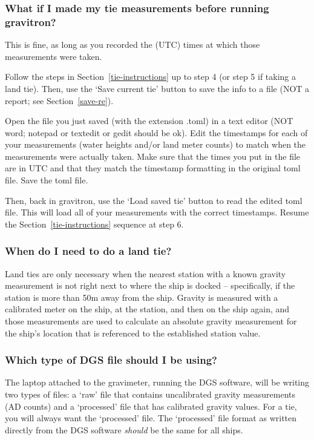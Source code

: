 \documentclass{pfpe-manual}
\begin{document}
\subsubsection{What if I made my tie measurements before running gravitron?}
\label{later}
This is fine, as long as you recorded the (UTC) times at which those measurements were taken.

Follow the steps in Section~\ref{tie-instructions} up to step 4 (or step 5 if taking a land tie). Then, use the `Save current tie' button to save the info to a file (NOT a report; see Section~\ref{save-re}). 

Open the file you just saved (with the extension .toml) in a text editor (NOT word; notepad or textedit or gedit should be ok). Edit the timestamps for each of your measurements (water heights and/or land meter counts) to match when the measurements were actually taken. Make sure that the times you put in the file are in UTC and that they match the timestamp formatting in the original toml file. Save the toml file. 

Then, back in gravitron, use the `Load saved tie' button to read the edited toml file. This will load all of your measurements with the correct timestamps. Resume the Section~\ref{tie-instructions} sequence at step 6.

\subsubsection{When do I need to do a land tie?}
Land ties are only necessary when the nearest station with a known gravity measurement is not right next to where the ship is docked -- specifically, if the station is more than 50m away from the ship. Gravity is measured with a calibrated meter on the ship, at the station, and then on the ship again, and those measurements are used to calculate an absolute gravity measurement for the ship's location that is referenced to the established station value.

\subsubsection{Which type of DGS file should I be using?}
\label{file-types}
The laptop attached to the gravimeter, running the DGS software, will be writing two types of files: a `raw' file that contains uncalibrated gravity measurements (AD counts) and a `processed' file that has calibrated gravity values. For a tie, you will always want the `processed' file. The `processed' file format as written directly from the DGS software \textit{should} be the same for all ships. 
\end{document}
